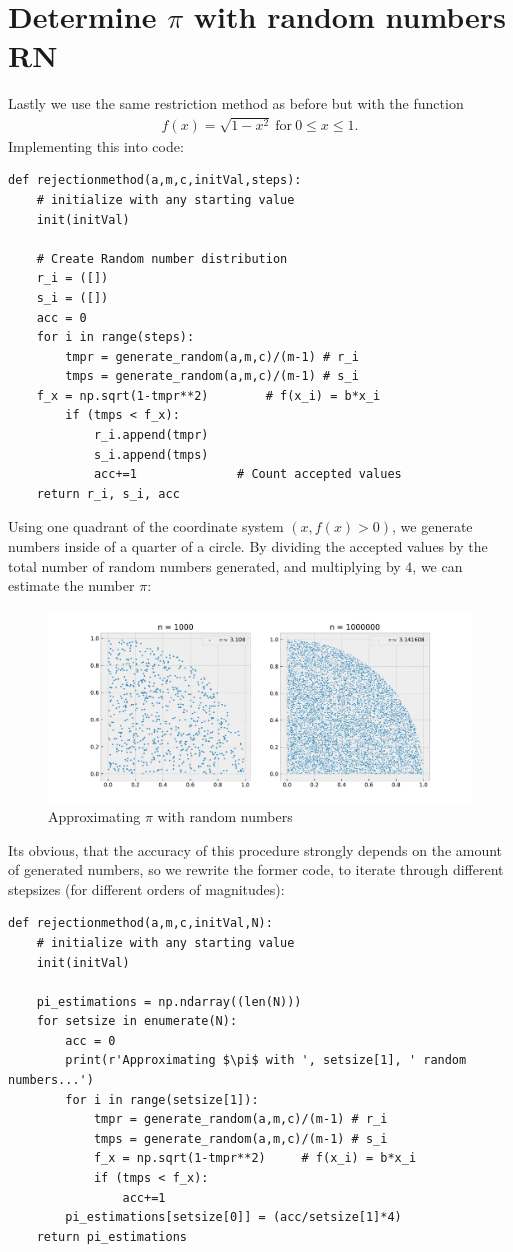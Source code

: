 \documentclass{article}
\begin{document}
\section{Determine \( \pi \) with random numbers RN}
Lastly we use the same restriction method as before but with the function
\begin{align}
    f(x) = \sqrt{1-x^2} \ \text{for} \ 0 \leq x \leq 1.
\end{align}
Implementing this into code:
\begin{lstlisting}
def rejectionmethod(a,m,c,initVal,steps):
    # initialize with any starting value
    init(initVal)

    # Create Random number distribution
    r_i = ([])
    s_i = ([])
    acc = 0
    for i in range(steps):
        tmpr = generate_random(a,m,c)/(m-1) # r_i
        tmps = generate_random(a,m,c)/(m-1) # s_i
	f_x = np.sqrt(1-tmpr**2)	    # f(x_i) = b*x_i
        if (tmps < f_x): 
            r_i.append(tmpr)
            s_i.append(tmps)
            acc+=1			    # Count accepted values
    return r_i, s_i, acc
\end{lstlisting}
Using one quadrant of the coordinate system \( (x, f(x) > 0) \), we generate
numbers inside of a quarter of a circle. By dividing the accepted values by
the total number of random numbers generated, and multiplying by \( 4 \),
we can estimate the number \( \pi \):
\begin{figure}[H]
    \centering
    \includegraphics[width=12cm]{Fig3-1.pdf}
    \caption{Approximating \( \pi \) with random numbers}
\end{figure}
Its obvious, that the accuracy of this procedure strongly depends on the amount
of generated numbers, so we rewrite the former code, to iterate through
different stepsizes (for different orders of magnitudes):
\begin{lstlisting}
def rejectionmethod(a,m,c,initVal,N):
    # initialize with any starting value
    init(initVal)

    pi_estimations = np.ndarray((len(N)))
    for setsize in enumerate(N):
        acc = 0
        print(r'Approximating $\pi$ with ', setsize[1], ' random numbers...')
        for i in range(setsize[1]):
            tmpr = generate_random(a,m,c)/(m-1) # r_i
            tmps = generate_random(a,m,c)/(m-1) # s_i
            f_x = np.sqrt(1-tmpr**2)     # f(x_i) = b*x_i
            if (tmps < f_x): 
                acc+=1
        pi_estimations[setsize[0]] = (acc/setsize[1]*4)
    return pi_estimations
\end{lstlisting}
\end{document}
